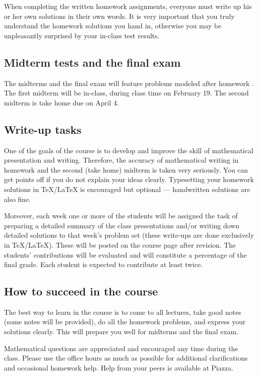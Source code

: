 \documentclass[oneside,11pt]{amsart}
\begin{document}
When completing the written homework assignments, everyone must write up his or her own
solutions in their own words.
It is very important that you truly understand the homework solutions you hand
in, otherwise you may be unpleasantly surprised by your in-class test results.

\subsection{Midterm tests and the final exam}

The midterms and the final exam will feature 
problems modeled after homework .
The first midterm will be in-class, during class time on February 19. 
The second midterm is take home due on April 4.

\subsection{Write-up tasks}

One of the goals of the course is to develop and improve 
the skill of mathematical presentation and writing. 
Therefore, the accuracy of mathematical writing
in homework and the second (take home) midterm 
is taken very seriously. You can get points off
if you do not explain your ideas clearly. 
Typesetting your homework solutions in \TeX/\LaTeX{} is encouraged
but optional --- handwritten solutions are also fine.

Moreover, each week one or more of the students will be assigned the task of
preparing a detailed summary of the class presentations and/or writing down
detailed solutions to that week’s problem set (these write-ups are done
exclusively in \TeX/\LaTeX{}). These will be posted on the
course page after revision. The students' contributions will be evaluated and
will constitute a percentage of the final grade. Each student is expected
to contribute at least twice.

\subsection{How to succeed in the course}

The best way to learn in the course is to come to all lectures, take good notes
(some notes will be provided),
do all the homework problems, and express your solutions 
clearly. 
This will prepare you well for midterms and the final exam.

Mathematical questions are appreciated and encouraged any time during the
class. Please use the office hours as much as possible for additional
clarifications and occasional homework help.
Help from your peers is available at Piazza.
\end{document}
